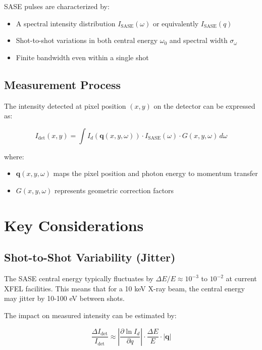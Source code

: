 \documentclass[12pt,a4paper]{article}
\begin{document}
SASE pulses are characterized by:
\begin{itemize}
\item A spectral intensity distribution $I_{\text{SASE}}(\omega)$ or equivalently $I_{\text{SASE}}(q)$
\item Shot-to-shot variations in both central energy $\omega_0$ and spectral width $\sigma_\omega$
\item Finite bandwidth even within a single shot
\end{itemize}

\subsection{Measurement Process}

The intensity detected at pixel position $(x,y)$ on the detector can be expressed as:

\begin{equation}
I_{\text{det}}(x,y) = \int I_d(\mathbf{q}(x,y,\omega)) \cdot I_{\text{SASE}}(\omega) \cdot G(x,y,\omega) \, d\omega
\end{equation}

where:
\begin{itemize}
\item $\mathbf{q}(x,y,\omega)$ maps the pixel position and photon energy to momentum transfer
\item $G(x,y,\omega)$ represents geometric correction factors
\end{itemize}

\section{Key Considerations}

\subsection{Shot-to-Shot Variability (Jitter)}

The SASE central energy typically fluctuates by $\Delta E/E \approx 10^{-3}$ to $10^{-2}$ at current XFEL facilities. This means that for a 10 keV X-ray beam, the central energy may jitter by 10-100 eV between shots.

The impact on measured intensity can be estimated by:

\begin{equation}
\frac{\Delta I_{\text{det}}}{I_{\text{det}}} \approx \left|\frac{\partial \ln I_d}{\partial q}\right| \cdot \frac{\Delta E}{E} \cdot |\mathbf{q}|
\end{equation}
\end{document}
